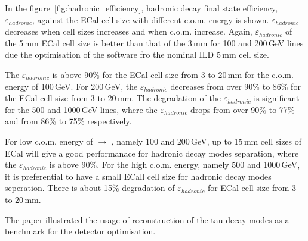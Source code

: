 \documentclass[a4paper,11pt]{article}
\begin{document}
In the figure~\ref{fig:hadronic_efficiency}, \Ptau hadronic decay final state efficiency, $\varepsilon_{hadronic}$, against the ECal cell size with different c.o.m. energy is shown. $\varepsilon_{hadronic}$ decreases when cell sizes increases and when c.o.m. increase.  Again, $\varepsilon_{hadronic}$ of the 5\,mm ECal cell size is better than that of the 3\,mm for 100 and 200\,GeV lines due the optimisation of the software fro the nominal ILD 5\,mm cell size.

The $\varepsilon_{hadronic}$ is above 90\% for the ECal cell size from 3 to 20\,mm for the c.o.m. energy of 100\,GeV. For 200\,GeV, the $\varepsilon_{hadronic}$ decreases from over 90\% to 86\% for the ECal cell size from 3 to 20\,mm. The degradation of the $\varepsilon_{hadronic}$ is significant for the 500 and 1000\,GeV lines, where the $\varepsilon_{hadronic}$ drops from over 90\% to 77\%  and from 86\% to 75\% respectively. 

For low c.o.m. energy of \Pelectron\APelectron $\to$ \Ptauon\APtauon, namely 100 and 200\,GeV, up to 15\,mm cell sizes of ECal will give a good performanace for \Ptau hadronic decay modes separation, where the $\varepsilon_{hadronic}$ is above 90\%. For the high c.o.m. energy, namely 500 and 1000\,GeV, it is preferential to have a small ECall cell size for \Ptau hadronic decay modes seperation. There is about 15\% degradation of $\varepsilon_{hadronic}$ for ECal cell size from 3 to 20\,mm.


The paper illustrated the usage of reconstruction of the tau decay modes as a benchmark for the detector optimisation. 




\end{document}
